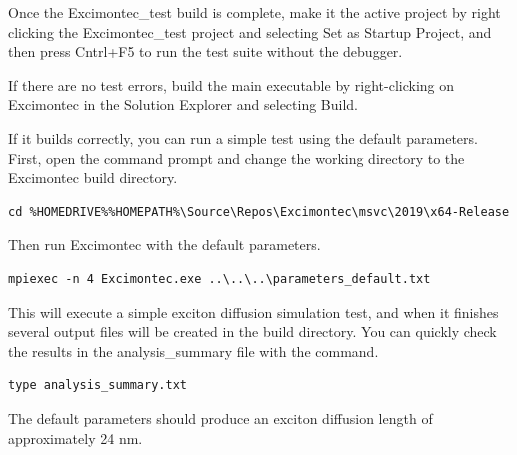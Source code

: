 \documentclass[%
 reprint,onecolumn,notitlepage,
superscriptaddress,longbibliography,
 amsmath,amssymb,
 aps,rmp,floatfix,
]{revtex4-1}
\begin{document}
\begin{enumerate}
Once the Excimontec\_test build is complete, make it the active project by right clicking the Excimontec\_test project and selecting Set as Startup Project, and then press Cntrl+F5 to run the test suite without the debugger.

If there are no test errors, build the main executable by right-clicking on Excimontec in the Solution Explorer and selecting Build.

If it builds correctly, you can run a simple test using the default parameters.
First, open the command prompt and change the working directory to the Excimontec build directory.

\begin{verbatim}
cd %HOMEDRIVE%%HOMEPATH%\Source\Repos\Excimontec\msvc\2019\x64-Release
\end{verbatim}

Then run Excimontec with the default parameters.
\begin{verbatim}
mpiexec -n 4 Excimontec.exe ..\..\..\parameters_default.txt
\end{verbatim}

This will execute a simple exciton diffusion simulation test, and when it finishes several output files will be created in the build directory.
You can quickly check the results in the analysis\_summary file with the command.
\begin{verbatim}
type analysis_summary.txt
\end{verbatim}
The default parameters should produce an exciton diffusion length of approximately 24 nm.


\end{enumerate}


\end{document}
